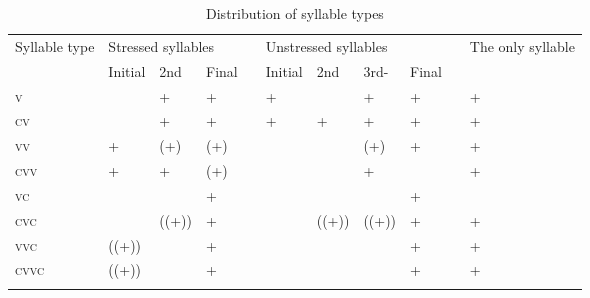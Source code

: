 \begin{table}
\caption{Distribution of syllable types}
\label{tab:7:syllabletypes}
\begin{tabular}{lllllllllll}
\mytoprule
Syllable type & \multicolumn{3}{l}{Stressed syllables} &  & \multicolumn{4}{l}{Unstressed syllables}  &  & The only syllable\\
 & Initial & 2nd{\footnotemark} & Final &  & Initial & 2nd & 3rd- & Final &  & \\
\midrule
\textsc{v} &  & +\par & +\par &  & +\par &  & +\par & +\par &  & +\par\\
\textsc{cv} &  & +\par & +\par &  & +\par & +\par & +\par & +\par &  & +\par\\
\textsc{vv} & +\par & (+)\par & (+)\par &  &  &  & (+)\par & +\par &  & +\par\\
\textsc{cvv} & +\par & +\par & (+)\par &  &  &  & +\par &  &  & +\par\\
\textsc{vc} &  &  & +\par &  &  &  &  & +\par &  & \\
\textsc{cvc} &  & ((+))\par & +\par &  &  & ((+))\par & ((+))\par & +\par &  & +\par\\
\textsc{vvc} & ((+))\par &  & +\par &  &  &  &  & +\par &  & +\par\\
\textsc{cvvc} & ((+))\par &  & +\par &  &  &  &  & +\par &  & +\par\\
\mybottomrule
\end{tabular}
\end{table}

